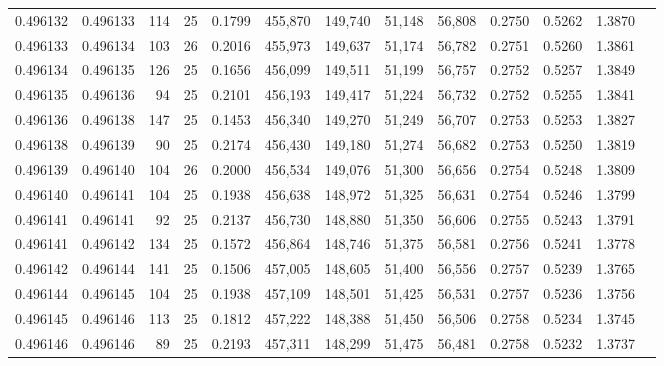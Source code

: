 \begin{tabular}{rrrrrrrrrrrrr}
0.496132 & 0.496133 &   114 &  25 &                                     0.1799 & 455,870 & 149,740 &  51,148 &  56,808 & 0.2750 & 0.5262 & 1.3870 \\
0.496133 & 0.496134 &   103 &  26 &                                     0.2016 & 455,973 & 149,637 &  51,174 &  56,782 & 0.2751 & 0.5260 & 1.3861 \\
0.496134 & 0.496135 &   126 &  25 &                                     0.1656 & 456,099 & 149,511 &  51,199 &  56,757 & 0.2752 & 0.5257 & 1.3849 \\
0.496135 & 0.496136 &    94 &  25 &                                     0.2101 & 456,193 & 149,417 &  51,224 &  56,732 & 0.2752 & 0.5255 & 1.3841 \\
0.496136 & 0.496138 &   147 &  25 &                                     0.1453 & 456,340 & 149,270 &  51,249 &  56,707 & 0.2753 & 0.5253 & 1.3827 \\
0.496138 & 0.496139 &    90 &  25 &                                     0.2174 & 456,430 & 149,180 &  51,274 &  56,682 & 0.2753 & 0.5250 & 1.3819 \\
0.496139 & 0.496140 &   104 &  26 &                                     0.2000 & 456,534 & 149,076 &  51,300 &  56,656 & 0.2754 & 0.5248 & 1.3809 \\
0.496140 & 0.496141 &   104 &  25 &                                     0.1938 & 456,638 & 148,972 &  51,325 &  56,631 & 0.2754 & 0.5246 & 1.3799 \\
0.496141 & 0.496141 &    92 &  25 &                                     0.2137 & 456,730 & 148,880 &  51,350 &  56,606 & 0.2755 & 0.5243 & 1.3791 \\
0.496141 & 0.496142 &   134 &  25 &                                     0.1572 & 456,864 & 148,746 &  51,375 &  56,581 & 0.2756 & 0.5241 & 1.3778 \\
0.496142 & 0.496144 &   141 &  25 &                                     0.1506 & 457,005 & 148,605 &  51,400 &  56,556 & 0.2757 & 0.5239 & 1.3765 \\
0.496144 & 0.496145 &   104 &  25 &                                     0.1938 & 457,109 & 148,501 &  51,425 &  56,531 & 0.2757 & 0.5236 & 1.3756 \\
0.496145 & 0.496146 &   113 &  25 &                                     0.1812 & 457,222 & 148,388 &  51,450 &  56,506 & 0.2758 & 0.5234 & 1.3745 \\
0.496146 & 0.496146 &    89 &  25 &                                     0.2193 & 457,311 & 148,299 &  51,475 &  56,481 & 0.2758 & 0.5232 & 1.3737 \\

\end{tabular}
